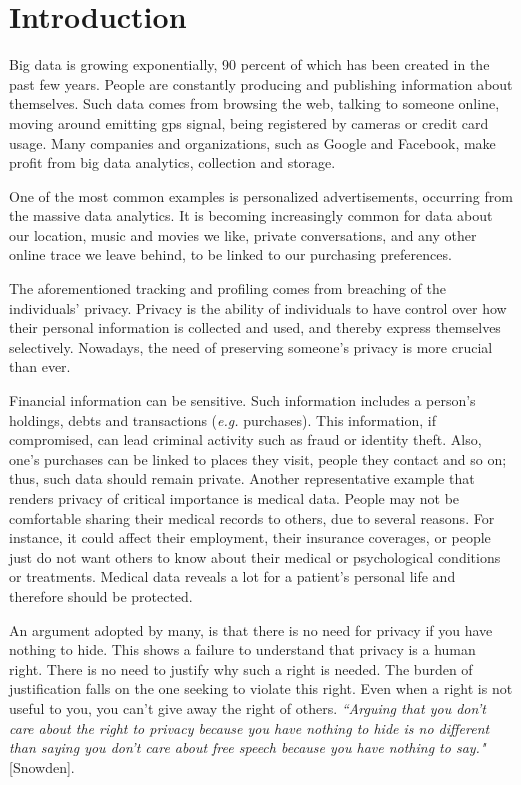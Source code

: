 \chapter{Introduction}\label{c:introduction}


Big data is growing exponentially, 90 percent of which has been created in the past few years. People are constantly producing and publishing information about themselves.
Such data comes from browsing the web, talking to someone online, moving around emitting gps signal, being registered by cameras or credit card usage.
Many companies and organizations, such as Google and Facebook, make profit from big data analytics, collection and storage.

One of the most common examples is personalized advertisements, occurring from the massive data analytics.
It is becoming increasingly common for data about our location, music and movies we like, private conversations, and any other online trace we leave behind, to be linked to our purchasing preferences.

The aforementioned tracking and profiling comes from breaching of the individuals’ privacy.
Privacy is the ability of individuals to have control over how their personal information is collected and used, and thereby express themselves selectively.
Nowadays, the need of preserving someone's privacy is more crucial than ever.

Financial information can be sensitive. Such information includes a person’s holdings, debts and transactions (\textit{e.g.} purchases).
This information, if compromised, can lead criminal activity such as fraud or identity theft.
Also, one’s purchases can be linked to places they visit, people they contact and so on; thus, such data should remain private. Another representative example that renders privacy of critical importance is medical data.
People may not be comfortable sharing their medical records to others, due to several reasons.
For instance, it could affect their employment, their insurance coverages, or people just do not want others to know about their medical or psychological conditions or treatments.
Medical data reveals a lot for a patient’s personal life and therefore should be protected.

An argument adopted by many, is that there is no need for privacy if you have nothing to hide.
This shows a failure to understand that privacy is a human right.
There is no need to justify why such a right is needed.
The burden of justification falls on the one seeking to violate this right.
Even when a right is not useful to you, you can't give away the right of others.
\textit{``Arguing that you don't care about the right to privacy because you have nothing to hide is no different than saying you don't care about free speech because you have nothing to say."} [Snowden].

